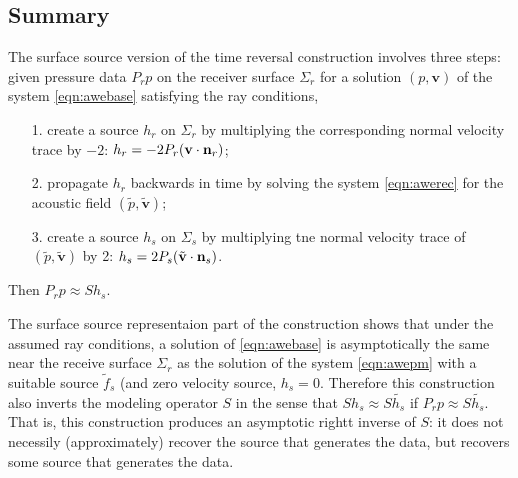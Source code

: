 \documentclass[georeport,12pt]{geophysics}
\newcommand{\bv}{\mathbf{v}}
\begin{document}
\subsection{Summary}
The surface source version of the time reversal construction involves three steps: given
pressure data $P_rp$ on the receiver surface $\Sigma_r$ for a solution
$(p,\bv)$ of the system \ref{eqn:awebase} satisfying the ray conditions,
\begin{itemize}
\item[1. ] create a source $h_r$ on $\Sigma_r$
  by multiplying the corresponding normal velocity trace by $-2$: $h_r = -2P_r(\bv
  \cdot {\bf n}_r)$;
\item[2. ] propagate $h_r$ backwards in time by solving the system
  \ref{eqn:awerec} for the acoustic field $(\tilde{p},\tilde{\bv})$;
\item[3. ] create a source $h_s$ on $\Sigma_s$ by  multiplying tne
  normal velocity trace of $(\tilde{p},\tilde{\bv})$ by 2: $h_s = 2P_s(\tilde{\bv}
  \cdot {\bf n}_s)$.
\end{itemize}
Then $P_r p \approx Sh_s$.

The surface source representaion part of the construction shows that
under the assumed ray conditions, a solution of \ref{eqn:awebase} is
asymptotically the same near the receive surface $\Sigma_r$ as the
solution of the system \ref{eqn:awepm} with a suitable source
$\tilde{f}_s$ (and zero velocity source, $h_s=0$. Therefore this
construction also inverts the modeling operator $S$ in the sense that
$Sh_s\approx S\tilde{h_s}$ if $P_rp \approx S\tilde{h_s}$. That is,
this construction produces an asymptotic rightt inverse of $S$: it
does not necessily (approximately) recover the source that generates
the data, but recovers some source that generates the data.
\end{document}
